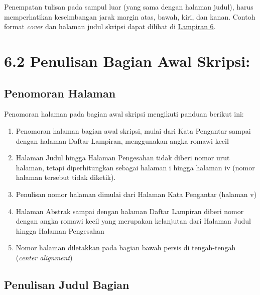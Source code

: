 \documentclass[
  indonesian,
  letterpaper,
]{scrbook}
\providecommand{\tightlist}{%
  \setlength{\itemsep}{0pt}\setlength{\parskip}{0pt}}
\begin{document}
Penempatan tulisan pada sampul luar (yang sama dengan halaman judul),
harus memperhatikan keseimbangan jarak margin atas, bawah, kiri, dan
kanan. Contoh format \emph{cover} dan halaman judul skripsi dapat
dilihat di \hyperref[_Lampiran_6_Contoh]{Lampiran 6}.

\section{6.2 Penulisan Bagian Awal
Skripsi:}\label{penulisan-bagian-awal-skripsi}

\subsection{Penomoran Halaman}\label{penomoran-halaman}

Penomoran halaman pada bagian awal skripsi mengikuti panduan berikut
ini:

\begin{enumerate}
\def\labelenumi{\alph{enumi}.}
\tightlist
\item
  Penomoran halaman bagian awal skripsi, mulai dari Kata Pengantar
  sampai dengan halaman Daftar Lampiran, menggunakan angka romawi kecil
\item
  Halaman Judul hingga Halaman Pengesahan tidak diberi nomor urut
  halaman, tetapi diperhitungkan sebagai halaman i hingga halaman iv
  (nomor halaman tersebut tidak diketik).
\item
  Penulisan nomor halaman dimulai dari Halaman Kata Pengantar (halaman
  v)
\item
  Halaman Abstrak sampai dengan halaman Daftar Lampiran diberi nomor
  dengan angka romawi kecil yang merupakan kelanjutan dari Halaman Judul
  hingga Halaman Pengesahan
\item
  Nomor halaman diletakkan pada bagian bawah persis di tengah-tengah
  (\emph{center alignment})
\end{enumerate}

\subsection{Penulisan Judul Bagian}\label{penulisan-judul-bagian}
\end{document}
